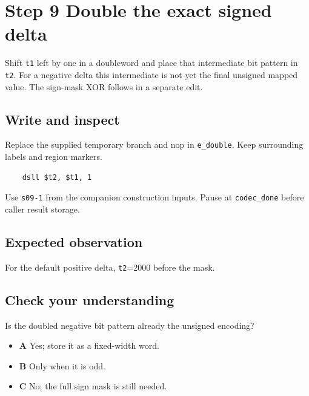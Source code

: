 \section{Step 9 Double the exact signed delta}\label{delta-s09}

Shift \texttt{t1} left by one in a doubleword and place that intermediate bit pattern in \texttt{t2}. For a negative delta this intermediate is not yet the final unsigned mapped value. The sign-mask XOR follows in a separate edit.

\subsection{Write and inspect}
Replace the supplied temporary branch and nop in \texttt{e\_double}. Keep surrounding labels and region markers.

\begin{verbatim}
    dsll $t2, $t1, 1
\end{verbatim}
Use \texttt{s09-1} from the companion construction inputs. Pause at \texttt{codec\_done} before caller result storage.

\subsection{Expected observation}
For the default positive delta, \texttt{t2}=2000 before the mask.

\subsection{Check your understanding}
Is the doubled negative bit pattern already the unsigned encoding?

\begin{itemize}
  \item \textbf{A} Yes; store it as a fixed-width word.
  \item \textbf{B} Only when it is odd.
  \item \textbf{C} No; the full sign mask is still needed.
\end{itemize}
